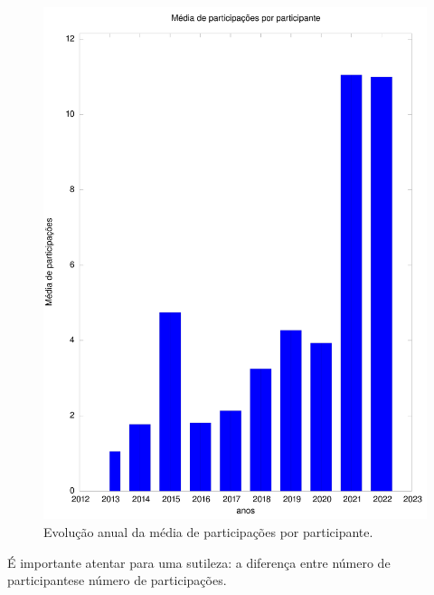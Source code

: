 \documentclass[
12pt,		%
openright,	%
twoside,  %
a4paper,			%
chapter=TITLE,		%
english,			%
french,				%
spanish,			%
brazil				%
]{USPSC-classe/USPSC}
\begin{document}
\begin{figure}[max size={\textwidth}{\textheight}]
\begin{minipage}[b]{0.4\linewidth}
                \includegraphics[width=1.0\linewidth]{../../imagens/output-media-participacoes.jpeg}
                \caption{Evolu\c{c}\~ao anual da m\'edia de participa\c{c}\~oes por participante.}
                \label{a8f2d72073b88290f9b8731b144383d2f7c4dc4b}
\end{minipage}%
\hspace{0.5cm}
\end{figure}



\'E importante atentar para uma sutileza: a diferen\c{c}a entre \textquotedbl n\'umero de participantes\textquotedbl  e \textquotedbl n\'umero de participa\c{c}\~oes\textquotedbl .
\end{document}
